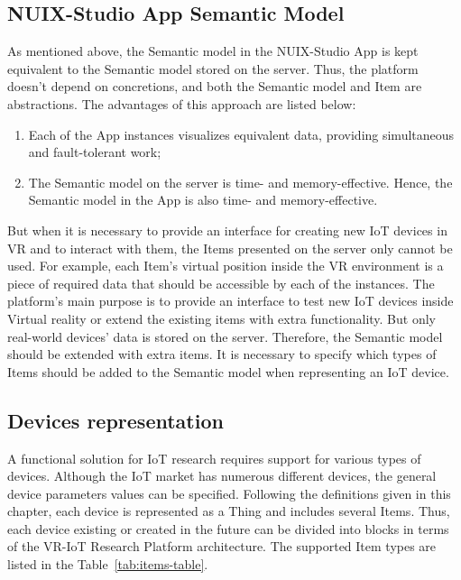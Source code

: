 \subsection{NUIX-Studio App Semantic Model}

As mentioned above, the Semantic model in the NUIX-Studio App is kept equivalent to the Semantic model stored on the server. Thus, the platform doesn't depend on concretions, and both the Semantic model and Item are abstractions. The advantages of this approach are listed below:

\begin{enumerate}
    \item Each of the App instances visualizes equivalent data, providing simultaneous and fault-tolerant work;
    \item The Semantic model on the server is time- and memory-effective. Hence, the Semantic model in the App is also time- and memory-effective.
\end{enumerate}

But when it is necessary to provide an interface for creating new IoT devices in VR and to interact with them, the Items presented on the server only cannot be used. For example, each Item's virtual position inside the VR environment is a piece of required data that should be accessible by each of the instances. The platform's main purpose is to provide an interface to test new IoT devices inside Virtual reality or extend the existing items with extra functionality. But only real-world devices' data is stored on the server. Therefore, the Semantic model should be extended with extra items. It is necessary to specify which types of Items should be added to the Semantic model when representing an IoT device.

\subsection{Devices representation}

A functional solution for IoT research requires support for various types of devices. Although the IoT market has numerous different devices, the general device parameters values can be specified. Following the definitions given in this chapter, each device is represented as a Thing and includes several Items. Thus, each device existing or created in the future can be divided into blocks in terms of the VR-IoT Research Platform architecture. The supported Item types are listed in the Table~\ref{tab:items-table}.

